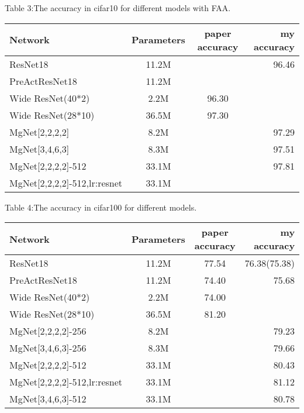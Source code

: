 \vbox{}
Table 3:The accuracy in cifar10 for different models with FAA.\\
\begin{tabular}{| l | c | c | r |}
	\hline
	Network                &     Parameters   &       paper accuracy   &   my accuracy     \\
	\hline
	ResNet18               &      11.2M      &                         &      96.46         \\
	\hline
	PreActResNet18         &      11.2M      &                         &                  \\
	\hline
	Wide ResNet(40*2)      &      2.2M       &         96.30           &              \\
	\hline
	Wide ResNet(28*10)     &      36.5M      &         97.30           &               \\
	\hline
	MgNet[2,2,2,2]         &      8.2M       &                         &       97.29         \\
	\hline
	MgNet[3,4,6,3]         &      8.3M       &                         &       97.51          \\
	\hline
	MgNet[2,2,2,2]-512     &      33.1M      &                        &       97.81         \\
	\hline
	MgNet[2,2,2,2]-512,lr:resnet&      33.1M      &              &                \\
	\hline
\end{tabular}

\vbox{}
Table 4:The accuracy in cifar100 for different models.\\
\begin{tabular}{| l | c | c | r |}
	\hline
	Network                &     Parameters   &       paper accuracy   &   my accuracy     \\
	\hline
	ResNet18               &      11.2M      &            77.54       &       76.38(75.38)        \\
	\hline
	PreActResNet18         &      11.2M      &            74.40       &       75.68        \\
	\hline
	Wide ResNet(40*2)      &      2.2M       &            74.00       &              \\
	\hline
	Wide ResNet(28*10)     &      36.5M      &            81.20       &               \\
	\hline
	MgNet[2,2,2,2]-256     &      8.2M       &                        &       79.23         \\
	\hline
	MgNet[3,4,6,3]-256     &      8.3M       &                        &       79.66           \\
	\hline
	MgNet[2,2,2,2]-512     &      33.1M      &                        &       80.43         \\
	\hline
	MgNet[2,2,2,2]-512,lr:resnet &      33.1M      &                        &       81.12         \\
	\hline
	MgNet[3,4,6,3]-512     &      33.1M      &                        &       80.78         \\
	\hline
\end{tabular}

